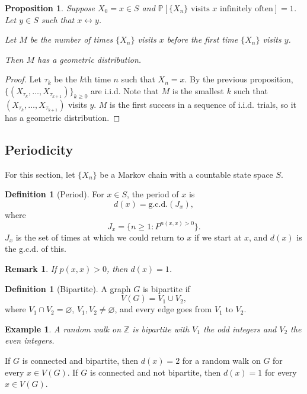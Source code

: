 \documentclass{tufte-handout}
\newcommand*\Z{\mathbb{Z}}
\renewcommand*\P{\mathbb{P}}
\let\O\varnothing
\newtheorem{rmk}[thm]{Remark}
\newtheorem{ex}[thm]{Example}
\newtheorem{prop}[thm]{Proposition}
\theoremstyle{definition}
\newtheorem{defn}[thm]{Definition}
\begin{document}
\begin{prop}
	Suppose $X_0 = x \in S$ and $\P\left[\{X_n\} \text{ visits } x \text{ infinitely often}\right] = 1$. Let $y \in S$ such that $x \leftrightarrow y$.

	Let $M$ be the number of times $\{X_n\}$ visits $x$ before the first time $\{X_n\}$ visits $y$.

	Then $M$ has a geometric distribution.
\end{prop}

\begin{proof}
	Let $\tau_k$ be the $k$th time $n$ such that $X_n = x$. By the previous proposition, $\{\left( X_{\tau_k}, \ldots, X_{\tau_{k+1}} \right)\}_{k \ge 0}$ are i.i.d. Note that $M$ is the smallest $k$ such that $\left( X_{\tau_k},\ldots,X_{\tau_{k+1}} \right)$ visits $y$. $M$ is the first success in a sequence of i.i.d. trials, so it has a geometric distribution.
\end{proof}

\subsection{Periodicity}
For this section, let $\{X_n\}$ be a Markov chain with a countable state space $S$.

\begin{defn}[Period]
	For $x \in S$, the period of $x$ is \[
		d(x) = \text{g.c.d.}(J_x)
	,\] where \[
		J_x = \{n \ge 1: P^{n(x,x) > 0}\}
	.\] $J_x$ is the set of times at which we could return to $x$ if we start at $x$, and $d(x)$ is the g.c.d. of this.
\end{defn}

\begin{rmk}
	If $p(x,x) > 0$, then $d(x) = 1$.
\end{rmk}

\begin{defn}[Bipartite]
	A graph $G$ is bipartite if \[
		V(G) = V_1 \cup  V_2
	,\] where $V_1 \cap V_2 = \O$, $V_1,V_2 \ne \O$, and every edge goes from $V_1$ to $V_2$.
\end{defn}

\begin{ex}
	A random walk on $\Z$ is bipartite with $V_1$ the odd integers and $V_2$ the even integers.
\end{ex}

If $G$ is connected and bipartite, then $d(x) = 2$ for a random walk on $G$ for every $x \in V(G)$. If $G$ is connected and not bipartite, then $d(x) = 1$ for every $x \in V(G)$.
\end{document}
